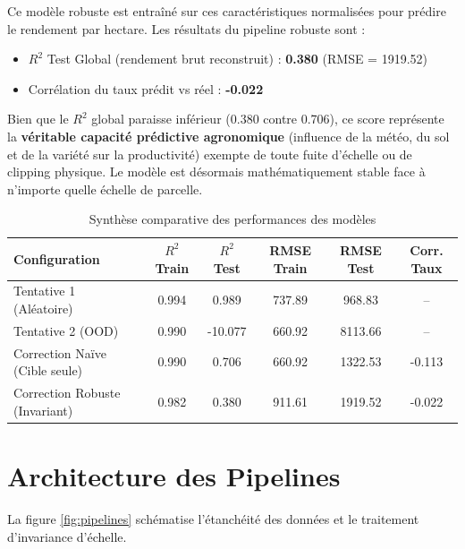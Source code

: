 \documentclass[11pt,a4paper]{article}
\begin{document}
Ce modèle robuste est entraîné sur ces caractéristiques normalisées pour prédire le rendement par hectare. Les résultats du pipeline robuste sont :
\begin{itemize}
    \item $R^2$ Test Global (rendement brut reconstruit) : \textbf{0.380} (RMSE = 1919.52)
    \item Corrélation du taux prédit vs réel : \textbf{-0.022}
\end{itemize}
Bien que le $R^2$ global paraisse inférieur (0.380 contre 0.706), ce score représente la \textbf{véritable capacité prédictive agronomique} (influence de la météo, du sol et de la variété sur la productivité) exempte de toute fuite d'échelle ou de clipping physique. Le modèle est désormais mathématiquement stable face à n'importe quelle échelle de parcelle.

\begin{table}[h]
\centering
\caption{Synthèse comparative des performances des modèles}
\label{tab:metrics}
\vspace{0.2cm}
\begin{tabular}{lccccc}
\toprule
\textbf{Configuration} & \textbf{$R^2$ Train} & \textbf{$R^2$ Test} & \textbf{RMSE Train} & \textbf{RMSE Test} & \textbf{Corr. Taux} \\
\midrule
Tentative 1 (Aléatoire) & 0.994 & 0.989 & 737.89 & 968.83 & -- \\
Tentative 2 (OOD) & 0.990 & -10.077 & 660.92 & 8113.66 & -- \\
\midrule
Correction Naïve (Cible seule) & 0.990 & 0.706 & 660.92 & 1322.53 & -0.113 \\
Correction Robuste (Invariant) & 0.982 & 0.380 & 911.61 & 1919.52 & -0.022 \\
\bottomrule
\end{tabular}
\end{table}

\section{Architecture des Pipelines}
La figure \ref{fig:pipelines} schématise l'étanchéité des données et le traitement d'invariance d'échelle.
\end{document}
